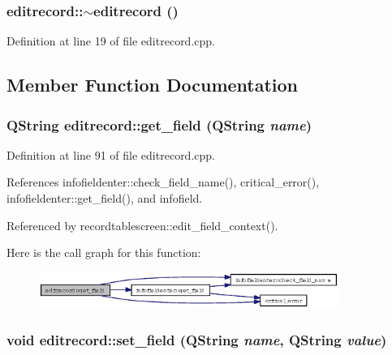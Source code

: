 \subsubsection{\setlength{\rightskip}{0pt plus 5cm}editrecord::$\sim$editrecord ()}\label{classeditrecord_4dfd76bc8e329941b5cb0df2bfce5438}




Definition at line 19 of file editrecord.cpp.

\subsection{Member Function Documentation}
\subsubsection{\setlength{\rightskip}{0pt plus 5cm}QString editrecord::get\_\-field (QString {\em name})}\label{classeditrecord_07fa56843727ad158ae073c9b40909e6}




Definition at line 91 of file editrecord.cpp.

References infofieldenter::check\_\-field\_\-name(), critical\_\-error(), infofieldenter::get\_\-field(), and infofield.

Referenced by recordtablescreen::edit\_\-field\_\-context().

Here is the call graph for this function:\begin{figure}[H]
\begin{center}
\leavevmode
\includegraphics[width=277pt]{classeditrecord_07fa56843727ad158ae073c9b40909e6_cgraph}
\end{center}
\end{figure}
\subsubsection{\setlength{\rightskip}{0pt plus 5cm}void editrecord::set\_\-field (QString {\em name}, QString {\em value})}\label{classeditrecord_7e6e9990768cb64f0e73e3f7b94fa5a1}




